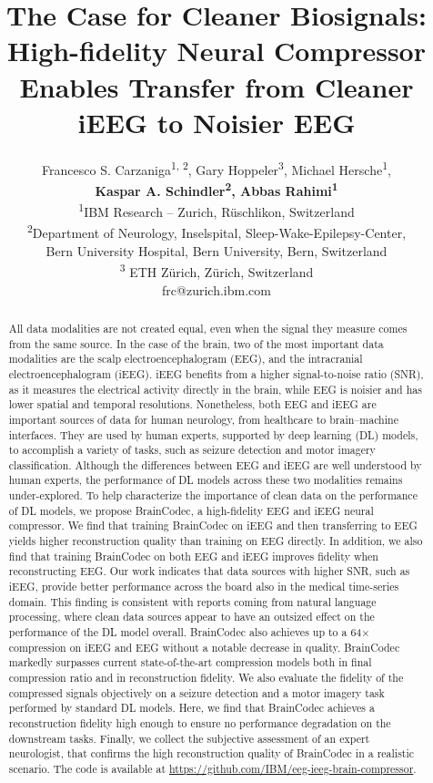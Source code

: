 \documentclass{article} %
\title{The Case for Cleaner Biosignals: High-fidelity Neural Compressor Enables Transfer from Cleaner iEEG to Noisier EEG}
\author{Francesco S. Carzaniga\textsuperscript{\rm 1, 2},
  Gary Hoppeler\textsuperscript{\rm 3},
  Michael Hersche\textsuperscript{\rm 1}, \\
  \textbf{Kaspar A. Schindler\textsuperscript{\rm 2},
  Abbas Rahimi\textsuperscript{\rm 1}}\\
  \textsuperscript{\rm 1}IBM Research -- Zurich, R\"{u}schlikon, Switzerland\\
  \textsuperscript{\rm 2}Department of Neurology, Inselspital, Sleep-Wake-Epilepsy-Center,\\ Bern University Hospital, Bern University, Bern, Switzerland\\
  \textsuperscript{\rm 3 }ETH Z\"{u}rich, Z\"{u}rich, Switzerland\\
  frc@zurich.ibm.com
}
\begin{document}
\maketitle

\begin{abstract}

All data modalities are not created equal, even when the signal they measure comes from the same source. In the case of the brain, two of the most important data modalities are the scalp electroencephalogram (EEG), and the intracranial electroencephalogram (iEEG).
iEEG benefits from a higher signal-to-noise ratio (SNR), as it measures the electrical activity directly in the brain, while EEG is noisier and has lower spatial and temporal resolutions. 
Nonetheless, both EEG and iEEG are important sources of data for human neurology, from healthcare to brain--machine interfaces. They are used by human experts, supported by deep learning (DL) models, to accomplish a variety of tasks, such as seizure detection and motor imagery classification.
Although the differences between EEG and iEEG are well understood by human experts, the performance of DL models across these two modalities remains under-explored. 
To help characterize the importance of clean data on the performance of DL models, we propose BrainCodec, a high-fidelity EEG and iEEG neural compressor.
We find that training BrainCodec on iEEG and then transferring to EEG yields higher reconstruction quality than training on EEG directly.
In addition, we also find that training BrainCodec on both EEG and iEEG improves fidelity when reconstructing EEG.
Our work indicates that data sources with higher SNR, such as iEEG, provide better performance across the board also in the medical time-series domain.
This finding is consistent with reports coming from natural language processing, where clean data sources appear to have an outsized effect on the performance of the DL model overall.
BrainCodec also achieves up to a 64$\times$ compression on iEEG and EEG without a notable decrease in quality. BrainCodec markedly surpasses current state-of-the-art compression models both in final compression ratio and in reconstruction fidelity.
We also evaluate the fidelity of the compressed signals objectively on a seizure detection and a motor imagery task performed by standard DL models. 
Here, we find that BrainCodec achieves a reconstruction fidelity high enough to ensure no performance degradation on the downstream tasks.
Finally, we collect the subjective assessment of an expert neurologist, that confirms the high reconstruction quality of BrainCodec in a realistic scenario. The code is available at \url{https://github.com/IBM/eeg-ieeg-brain-compressor}.
\end{abstract}
\end{document}
